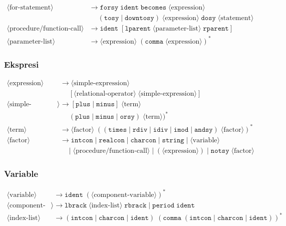 \documentclass[12pt,a4paper]{article}
\begin{document}
\begin{align*}
\langle \text{for-statement} \rangle &\rightarrow \texttt{forsy} \; \texttt{ident} \; \texttt{becomes} \; \langle \text{expression} \rangle \\
&\quad\; ( \texttt{tosy} \;|\; \texttt{downtosy} ) \; \langle \text{expression} \rangle \; \texttt{dosy} \; \langle \text{statement} \rangle \\
\langle \text{procedure/function-call} \rangle &\rightarrow \texttt{ident} \; [ \texttt{lparent} \; \langle \text{parameter-list} \rangle \; \texttt{rparent} ] \\
\langle \text{parameter-list} \rangle &\rightarrow \langle \text{expression} \rangle \; ( \texttt{comma} \; \langle \text{expression} \rangle )^*
\end{align*}

\subsubsection{Ekspresi}
\begin{align*}
\langle \text{expression} \rangle &\rightarrow \langle \text{simple-expression} \rangle \\
&\quad\;[ \langle \text{relational-operator} \rangle \; \langle \text{simple-expression} \rangle ] \\
\langle \text{simple-expression} \rangle &\rightarrow [ \texttt{plus} \;|\; \texttt{minus} ] \; \langle \text{term} \rangle \\
&\quad\; ( \texttt{plus} \;|\; \texttt{minus} \;|\; \texttt{orsy} ) \; \langle \text{term} \rangle )^* \\
\langle \text{term} \rangle &\rightarrow \langle \text{factor} \rangle \; ( ( \texttt{times} \;|\; \texttt{rdiv} \;|\; \texttt{idiv} \;|\; \texttt{imod} \;|\; \texttt{andsy} ) \; \langle \text{factor} \rangle )^* \\
\langle \text{factor} \rangle &\rightarrow \texttt{intcon} \;|\; \texttt{realcon} \;|\; \texttt{charcon} \;|\; \texttt{string} \;|\; \langle \text{variable} \rangle \\
&\quad\;|\; \langle \text{procedure/function-call} \rangle \;|\; ( \langle \text{expression} \rangle ) \;|\; \texttt{notsy} \; \langle \text{factor} \rangle
\end{align*}

\subsubsection{Variable}
\begin{align*}
\langle \text{variable} \rangle &\rightarrow \texttt{ident} \; ( \langle \text{component-variable} \rangle )^* \\
\langle \text{component-variable} \rangle &\rightarrow \texttt{lbrack} \; \langle \text{index-list} \rangle \; \texttt{rbrack} \;|\; \texttt{period} \; \texttt{ident} \\
\langle \text{index-list} \rangle &\rightarrow ( \texttt{intcon} \;|\; \texttt{charcon} \;|\; \texttt{ident} ) \; ( \texttt{comma} \; ( \texttt{intcon} \;|\; \texttt{charcon} \;|\; \texttt{ident} ) )^*
\end{align*}
\end{document}
